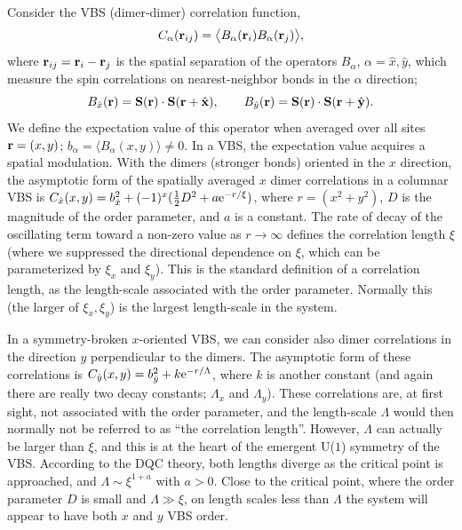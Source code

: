 \documentclass[range]{ar2e}
\begin{document}
Consider the VBS (dimer-dimer) correlation function,
\begin{equation}
C_{\alpha} ({\bf r}_{ij}) = \bigl \langle B_\alpha({\bf r}_i)B_\alpha({\bf r}_j) \bigr \rangle, 
\label{cddef}
\end{equation}
where ${\bf r}_{ij}={\bf r}_{i}-{\bf r}_{j}$ is the spatial separation of the operators $B_\alpha$, $\alpha=\hat x,\hat y$,
which measure the spin correlations on nearest-neighbor bonds in the $\alpha$ direction;
\begin{equation}
B_{\hat x}({\bf r})={\bf S}({\bf r}) \cdot {\bf S}({\bf r}+\hat {\bf x}),~~~~~~B_{\hat y}({\bf r})={\bf S}({\bf r}) \cdot {\bf S}({\bf r}+\hat {\bf y}).
\label{bxdef}
\end{equation}
We define the expectation value of this operator when averaged over all sites ${\bf r}=(x,y)$; $b_\alpha=\langle B_{\alpha}(x,y)\rangle \not = 0$. In a VBS, the 
expectation value acquires a spatial modulation. With the dimers (stronger bonds) oriented in the $x$ direction, the asymptotic form of the spatially averaged 
$x$ dimer correlations in a columnar VBS is $C_{\hat x}(x,y) = b_{\hat x}^2+(-1)^{x}(\hbox{$\frac{1}{2}$}D^2+a{\rm e}^{-r/\xi})$, where $r=(x^2+y^2)$, $D$ is the magnitude of the order 
parameter, and $a$ is a constant. The rate of decay of the oscillating term toward a non-zero value as $r\to \infty$ defines the correlation length $\xi$ (where we suppressed 
the directional dependence on $\xi$, which can be parameterized by $\xi_x$ and $\xi_y$). This is the standard definition of a correlation length, as the 
length-scale associated with the order parameter. Normally this (the larger of $\xi_x,\xi_y$) is the largest length-scale in the system. 

In a symmetry-broken $x$-oriented VBS, we can consider also dimer correlations in the direction $y$ perpendicular to the dimers. The asymptotic form of these 
correlations is $C_{\hat y}(x,y) = b_{\hat y}^2 + k{\rm e}^{-r/\Lambda}$, where $k$ is another constant (and again there are really two decay constants; $\Lambda_x$ and
$\Lambda_y$). These correlations are, at first sight, not associated with the order parameter, and the length-scale $\Lambda$ would then normally not be referred 
to as ``the correlation length''. However, $\Lambda$ can actually be larger than $\xi$, and this is at the heart of the emergent U($1$) symmetry of the VBS. 
According to the DQC theory, both lengths diverge as the critical point is approached, and $\Lambda \sim \xi^{1+a}$ with $a>0$. Close to the critical point, 
where the order parameter $D$ is small and $\Lambda \gg \xi$, on length scales less than $\Lambda$ the system will appear to have both $x$ and $y$ VBS order.
\end{document}

